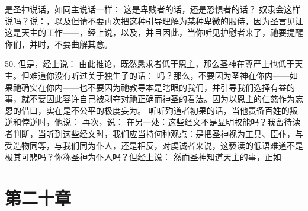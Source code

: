 是圣神说话，如同主说话一样： 这是卑贱者的话，还是恐惧者的话？ 奴隶会这样说吗？说：，以及但请不要再次把这种引导理解为某种卑微的服侍，因为圣言见证这是天主的工作——，经上说，以及，并且因此，当你听见护慰者来了，祂要提醒你们，并时，不要曲解其意。\par

50. 但是，经上说： 由此推论，既然恳求者低于恩主，那么圣神在尊严上也低于天主。但难道你没有听过关于独生子的话： 吗？那么，不要因为圣神在你内——如果祂确实在你内——也不要因为祂教导本是瞎眼的我们，并引导我们选择有益的事，就不要因此容许自己被剥夺对祂正确而神圣的看法。因为以恩主的仁慈作为忘恩的借口，实在是不公平的极度妄为。 听听殉道者初果的话，当他责备百姓的叛逆和悖逆时，他说： 再次，说： 在另一处：这些经文不是显明权能吗？我留待读者判断，当听到这些经文时，我们应当持何种观点：是把圣神视为工具、臣仆，与受造物同等，与我们同为仆人，还是相反，对虔诚者来说，这亵渎的低语难道不是极其可悲吗？你称圣神为仆人吗？但经上说： 然而圣神知道天主的事，正如\par


\section{第二十章}

\par

